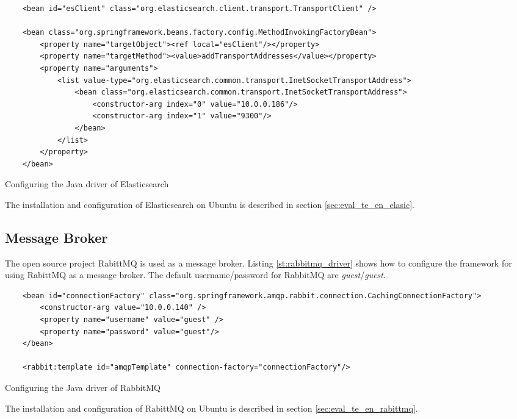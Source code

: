 \begin{code}
\begin{verbatim}
	<bean id="esClient" class="org.elasticsearch.client.transport.TransportClient" />
	
	<bean class="org.springframework.beans.factory.config.MethodInvokingFactoryBean">
		<property name="targetObject"><ref local="esClient"/></property>
		<property name="targetMethod"><value>addTransportAddresses</value></property>
		<property name="arguments"> 
			<list value-type="org.elasticsearch.common.transport.InetSocketTransportAddress">
				<bean class="org.elasticsearch.common.transport.InetSocketTransportAddress">
					<constructor-arg index="0" value="10.0.0.186"/>
					<constructor-arg index="1" value="9300"/>
				</bean>
		 	</list>
		</property>
	</bean>
\end{verbatim}
\caption{Configuring the Java driver of Elasticsearch}
\label{lst:elasticsearch_driver}
\end{code}

The installation and configuration of Elasticsearch on Ubuntu is described in section \ref{sec:eval_te_en_elasic}.

\subsection{Message Broker\label{sec:des_wq}}
The open source project RabittMQ is used as a message broker. Listing \ref{st:rabbitmq_driver}  shows how to configure the framework for using RabittMQ as a message broker. The default username/password for RabbitMQ are \textit{guest}/\textit{guest}.

\begin{code}
\begin{verbatim}
	<bean id="connectionFactory" class="org.springframework.amqp.rabbit.connection.CachingConnectionFactory">
	    <constructor-arg value="10.0.0.140" />
		<property name="username" value="guest" />
	    <property name="password" value="guest"/>
	</bean>
	
	<rabbit:template id="amqpTemplate" connection-factory="connectionFactory"/>
\end{verbatim}
\caption{Configuring the Java driver of RabbitMQ}
\label{lst:rabbitmq_driver}
\end{code}

The installation and configuration of RabittMQ on Ubuntu is described in section \ref{sec:eval_te_en_rabittmq}.

